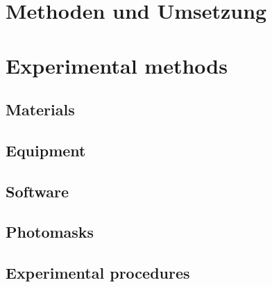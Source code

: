 {\chapter{Methoden und Umsetzung}}
{\chapter{Experimental methods}}
\label{sec:methods}

\section{Materials}
\section{Equipment}
\section{Software}
\section{Photomasks}
\section{Experimental procedures}